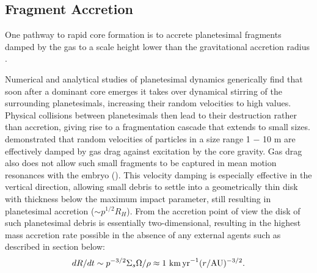 \subsection{Fragment Accretion}
One pathway to rapid core formation is to accrete planetesimal fragments damped by the gas to a scale height
lower than the gravitational accretion radius \citep{Rafikov2004}. 

Numerical and analytical studies of planetesimal dynamics generically find that soon after a dominant core emerges
it takes over dynamical stirring of the surrounding planetesimals, increasing their random velocities to high values.
Physical collisions between planetesimals then lead to their destruction rather than accretion, giving rise to a 
fragmentation cascade that extends to small sizes. \cite{Rafikov2004} demonstrated that random velocities of particles in a size
range 1 − 10 m are effectively damped by gas drag against excitation by the core gravity. Gas drag also does not allow
such small fragments to be captured in mean motion resonances with the embryo (\cite[e.g.][]{Levison2010}). This
velocity damping is especially effective in the vertical direction, allowing small debris to settle into a geometrically thin
disk with thickness below the maximum impact parameter, still resulting in planetesimal accretion ($\sim p^{1/2} R_H$). From
the accretion point of view the disk of such planetesimal debris is essentially two-dimensional, resulting in the highest
mass accretion rate possible in the absence of any external agents such as described in section  below:
\begin{equation}
dR/dt\sim p^{-3/2}\Sigma_s\Omega/\rho\approx 1\,\,{\rm km\, yr}^{-1}(r/{\rm AU})^{-3/2}.
\end{equation}

